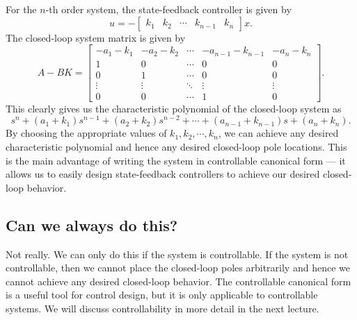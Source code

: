 \documentclass{ee122_notes}
\begin{document}
For the $n$-th order system, the state-feedback controller is given by
\[
u = -\begin{bmatrix} k_1 & k_2 & \cdots & k_{n-1} & k_n\end{bmatrix} x.
\]
The closed-loop system matrix is given by
\[
A - BK = \begin{bmatrix}
-a_1 - k_1 & -a_2 - k_2 & \cdots & -a_{n-1} - k_{n-1} & -a_n - k_n \\
1 & 0 & \cdots & 0 & 0 \\
0 & 1 & \cdots & 0 & 0 \\
\vdots & \vdots & \ddots & \vdots & \vdots \\
0 & 0 & \cdots & 1 & 0
\end{bmatrix}.
\]
This clearly gives us the characteristic polynomial of the closed-loop system as
\[
s^n + (a_1 + k_1) s^{n-1} + (a_2 + k_2) s^{n-2} + \cdots + (a_{n-1} + k_{n-1}) s + (a_n + k_n).
\]
By choosing the appropriate values of $k_1, k_2, \cdots, k_n$, we can achieve any desired characteristic polynomial and hence any desired closed-loop pole locations. This is the main advantage of writing the system in controllable canonical form --- it allows us to easily design state-feedback controllers to achieve our desired closed-loop behavior.

\subsection{Can we always do this?}
Not really. We can only do this if the system is controllable. If the system is not controllable, then we cannot place the closed-loop poles arbitrarily and hence we cannot achieve any desired closed-loop behavior. The controllable canonical form is a useful tool for control design, but it is only applicable to controllable systems. We will discuss controllability in more detail in the next lecture.
\end{document}
